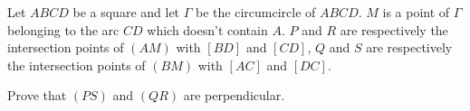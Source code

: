 Let $ABCD$ be a square and let $\Gamma$ be the circumcircle of $ABCD$. $M$ is a point of $\Gamma$ belonging to the arc $CD$ which doesn't contain $A$. $P$ and $R$ are respectively the intersection points of $(AM)$ with $[BD]$ and $[CD]$,  $Q$ and $S$ are respectively the intersection points of $(BM)$ with $[AC]$ and $[DC]$.

Prove that $(PS)$ and $(QR)$ are perpendicular.